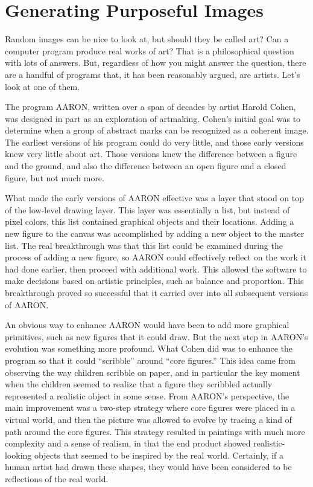 \section{Generating Purposeful Images}

Random images can be nice to look at, but should they be called art?
Can a computer program produce real works of art?
That is a philosophical question with lots of answers.
But, regardless of how you might answer the question,
there are a handful of programs that, it has been reasonably argued,
are artists. Let's look at one of them.

The program AARON,
written over a span of decades by artist Harold Cohen,
was designed in part as an exploration of artmaking. Cohen's
initial goal was to determine when a group of abstract marks can
be recognized as a coherent image. The earliest versions of his program
could do very little, and those early versions knew very little about art.
Those versions knew the difference between a figure and the ground, and also
the difference between an open figure and a closed figure, but
not much more.

What made the early versions of AARON effective was a layer that
stood on top of the low-level drawing layer. This layer was essentially
a list, but instead of pixel colors, this list contained graphical objects
and their locations. Adding a new figure to the canvas was accomplished
by adding a new object to the master list. The real breakthrough was
that this list could be examined during the process of adding
a new figure, so AARON could effectively reflect on the work it had
done earlier, then proceed with additional work.
This allowed the software to make decisions based on
artistic principles, such as balance and proportion.
This breakthrough proved so successful
that it carried over into all subsequent versions of AARON.

An obvious way to enhance AARON would have been to add more graphical
primitives, such as new figures that it could draw. But
the next step in AARON's evolution was something more profound. What
Cohen did was to enhance the program so that it could ``scribble'' around
``core figures.'' This idea came from observing the way children
scribble on paper, and in particular the key moment when the children
seemed to realize that a figure they scribbled actually represented a
realistic object in some sense. From AARON's perspective, the main improvement
was a two-step strategy where core figures
were placed in a virtual world,
and then the picture was allowed to evolve by tracing a kind of path
around the core figures.
This strategy resulted in paintings with much more complexity
and a sense of realism, in that the end product showed realistic-looking
objects that seemed to be inspired by the real world. Certainly, if a
human artist had drawn these shapes, they would have been considered to be
reflections of the real world.

